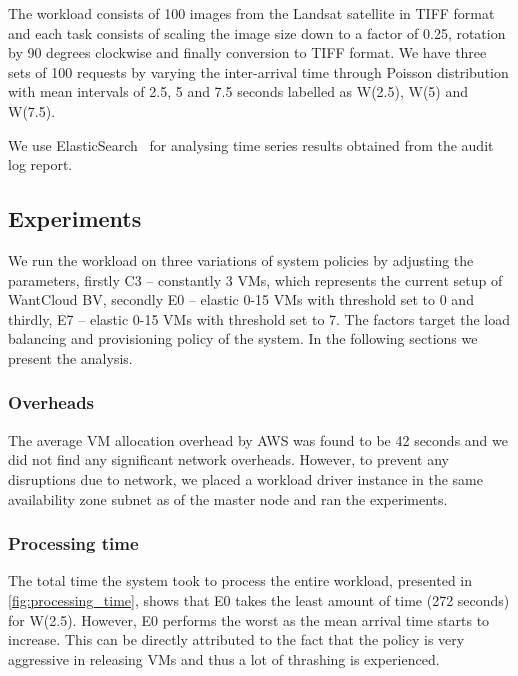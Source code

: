 \documentclass[a4paper]{IEEEtran}
\begin{document}
 The workload consists of 100 images from the Landsat satellite in TIFF format and each task consists of
 scaling the image size down to a factor of 0.25, rotation by 90 degrees clockwise and finally conversion to 
 TIFF format. We have three sets of 100 requests by varying the inter-arrival time through Poisson distribution
 with mean intervals of 2.5, 5 and 7.5 seconds labelled as \textsc{W(2.5)}, \textsc{W(5)} and \textsc{W(7.5)}.
 
 We use ElasticSearch~\cite{elasticsearch} for analysing time series results obtained from the audit log report. 

\subsection{Experiments}

We run the workload on three variations of system policies by adjusting the parameters,
 firstly \textsc{C3} -- constantly 3 VMs, which represents the current setup of WantCloud BV, secondly \textsc{E0} -- elastic 0-15 VMs with threshold set to 0 and thirdly, \textsc{E7} -- elastic 0-15 VMs with threshold set to 7. The factors target the load balancing and provisioning policy of the system. In the following sections we present the analysis.

\subsubsection{Overheads}

The average VM allocation overhead by AWS was found to be 42 seconds and we did not find any significant network overheads. However, to prevent any disruptions due to network, we placed a workload driver instance in the same availability zone subnet as of the master node and ran the experiments.

\subsubsection{Processing time}

The total time the system took to process the entire workload, presented
in \autoref{fig:processing_time}, shows that E0 takes the least amount of time (272 seconds) for W(2.5). However, E0 performs the worst as the mean arrival time starts to increase. This can be directly attributed to the fact that the policy is very aggressive in releasing VMs and thus a lot of thrashing is experienced.
\end{document}
